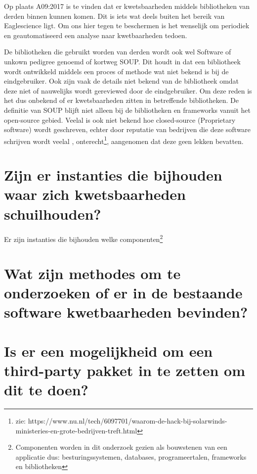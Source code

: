 Op plaats A09:2017 is te vinden dat er kwetsbaarheden middels bibliotheken van derden binnen kunnen komen. Dit is iets wat deels buiten het bereik van Eaglescience ligt. Om ons hier tegen te beschermen is het wenselijk om periodiek en geautomatiseerd een analyse naar kwetbaarheden tedoen.

De bibliotheken die gebruikt worden van derden wordt ook wel Software of unkown pedigree genoemd of kortweg SOUP. Dit houdt in dat een bibliotheek wordt ontwikkeld middels een proces of methode wat niet bekend is bij de eindgebruiker. Ook zijn vaak de details niet bekend van de bibliotheek omdat deze niet of nauwelijks wordt gereviewed door de eindgebruiker. Om deze reden is het dus onbekend of er kwetsbaarheden zitten in betreffende bibliotheken.
De definitie van SOUP blijft niet alleen bij de bibliotheken en frameworks vanuit het open-source gebied. Veelal is ook niet bekend hoe closed-source (Proprietary software) wordt geschreven, echter door reputatie van bedrijven die deze software schrijven wordt veelal , onterecht\footnote{zie: https://www.nu.nl/tech/6097701/waarom-de-hack-bij-solarwinds-ministeries-en-grote-bedrijven-treft.html }, aangenomen dat deze geen lekken bevatten.


\section{Zijn er instanties die bijhouden waar zich kwetsbaarheden schuilhouden?}
Er zijn instanties die bijhouden welke componenten\footnote{Componenten worden in dit onderzoek gezien als bouwstenen van een applicatie dus: besturingssystemen, databases,  programeertalen, frameworks en bibliotheken}
\section{Wat zijn methodes om te onderzoeken of er in de bestaande software kwetbaarheden bevinden?}

\section{Is er een mogelijkheid om een third-party pakket in te zetten om dit te doen?}
